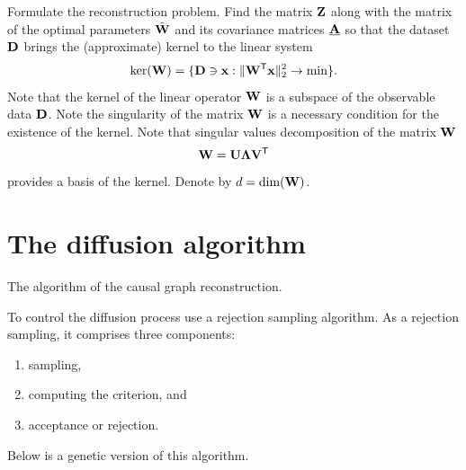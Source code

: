 \documentclass[12pt]{article}
\begin{document}
\bigskip
Formulate the reconstruction problem.
Find the matrix $\mathbf{Z}$ along with the matrix of the optimal parameters $\hat{\mathbf{W}}$ and its covariance matrices $\underline{\mathbf{A}}$
so that the dataset $\mathbf{D}$ brings the (approximate) kernel to the linear system
\[
    \ker(\mathbf{W}) =  \{\mathbf{D} \ni \mathbf{x} : \| \mathbf{W}^{\mathsf{T}}\mathbf{x} \|^2_2 \to \min \}.
\]
Note that the kernel of the linear operator $\mathbf{W}$ is a subspace of the observable data $\mathbf{D}$.
Note the singularity of the matrix $\mathbf{W}$ is a necessary condition for the existence of the kernel.
Note that singular values decomposition of the matrix $\mathbf{W}$
\[
    \mathbf{W} = \mathbf{U} {\boldsymbol{\Lambda}} \mathbf{V}^{\mathsf{T}}
\]
provides a basis of the kernel.
Denote by $d = \dim(\mathbf{W})$.


\section*{The diffusion algorithm}

The algorithm of the causal graph reconstruction.

To control the diffusion process use a rejection sampling algorithm.
As a rejection sampling, it comprises three components:
\begin{enumerate}[1)]
    \item sampling,
    \item computing the criterion, and
    \item acceptance or rejection.
\end{enumerate}
Below is a genetic version of this algorithm.
\end{document}

